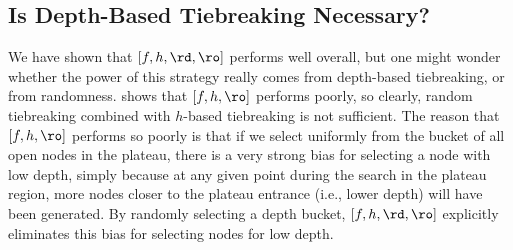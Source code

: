 



\subsection{Is Depth-Based Tiebreaking Necessary?}

We have shown that $[f,h,\rd,\ro]$ performs well overall, but
one might wonder whether the power of this strategy really comes from depth-based tiebreaking, or from randomness.
 shows that $[f,h,\ro]$ performs poorly, so clearly, random tiebreaking combined with $h$-based tiebreaking is not sufficient.
The reason that $[f,h,\ro]$ performs so poorly is that if we select uniformly from the bucket of all open nodes in the plateau, there is a very strong bias for selecting a node with low depth, simply because at any given point during the search in the plateau region, more nodes closer to the plateau entrance (i.e., lower depth) will have been generated.
By randomly selecting a depth bucket, $[f,h,\rd,\ro]$ explicitly eliminates this bias for selecting nodes for low depth.


